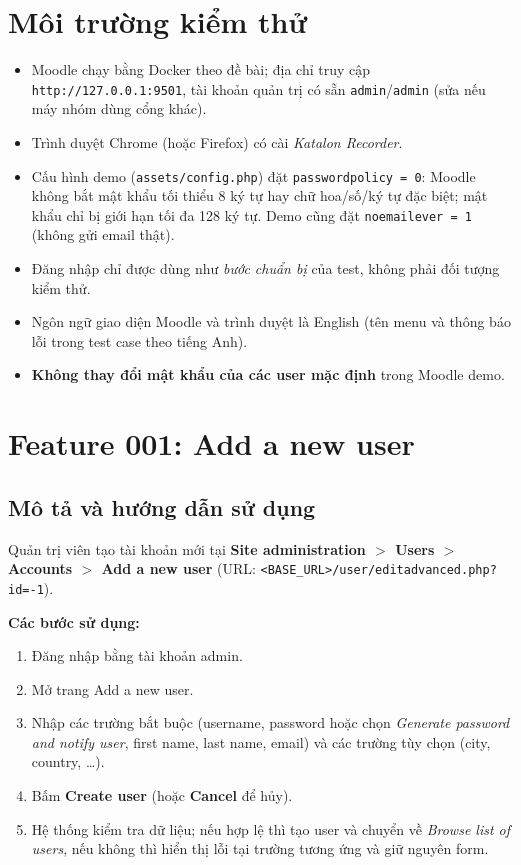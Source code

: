 \documentclass[12pt,a4paper]{article}
\begin{document}
\section{Môi trường kiểm thử}
\begin{itemize}[noitemsep]
  \item Moodle chạy bằng Docker theo đề bài; địa chỉ truy cập \texttt{http://127.0.0.1:9501}, tài khoản quản trị
        có sẵn \texttt{admin}/\texttt{admin} (sửa nếu máy nhóm dùng cổng khác).
  \item Trình duyệt Chrome (hoặc Firefox) có cài \textit{Katalon Recorder}.
  \item Cấu hình demo (\texttt{assets/config.php}) đặt \texttt{passwordpolicy = 0}: Moodle không bắt mật khẩu tối thiểu 8 ký tự hay
        chữ hoa/số/ký tự đặc biệt; mật khẩu chỉ bị giới hạn tối đa 128 ký tự. Demo cũng đặt \texttt{noemailever = 1} (không gửi email thật).
  \item Đăng nhập chỉ được dùng như \textit{bước chuẩn bị} của test, không phải đối tượng kiểm thử.
  \item Ngôn ngữ giao diện Moodle và trình duyệt là English (tên menu và thông báo lỗi trong test case theo tiếng Anh).
  \item \textbf{Không thay đổi mật khẩu của các user mặc định} trong Moodle demo.
\end{itemize}

\section{Feature 001: Add a new user}

\subsection{Mô tả và hướng dẫn sử dụng}
Quản trị viên tạo tài khoản mới tại \textbf{Site administration $>$ Users $>$ Accounts $>$ Add a new user}
(URL: \texttt{<BASE\_URL>/user/editadvanced.php?id=-1}).

\textbf{Các bước sử dụng:}
\begin{enumerate}[noitemsep]
  \item Đăng nhập bằng tài khoản admin.
  \item Mở trang Add a new user.
  \item Nhập các trường bắt buộc (username, password hoặc chọn \textit{Generate password and notify user},
        first name, last name, email) và các trường tùy chọn (city, country, \dots).
  \item Bấm \textbf{Create user} (hoặc \textbf{Cancel} để hủy).
  \item Hệ thống kiểm tra dữ liệu; nếu hợp lệ thì tạo user và chuyển về \textit{Browse list of users}, nếu không thì
        hiển thị lỗi tại trường tương ứng và giữ nguyên form.
\end{enumerate}
\end{document}
